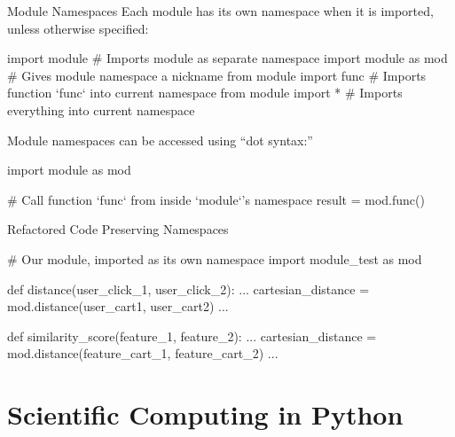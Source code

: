 \documentclass[11pt,table]{beamer}
\begin{document}
\begin{frame}[fragile]{}

\begin{block}{Module Namespaces}
Each module has its own namespace when it is imported, unless otherwise specified:
\begin{mintypython}
import module            # Imports module as separate namespace
import module as mod     # Gives module namespace a nickname 
from module import func  # Imports function `func` into current namespace
from module import *     # Imports everything into current namespace
\end{mintypython}

Module namespaces can be accessed using ``dot syntax:''
\begin{mintypython}
import module as mod

# Call function `func` from inside `module`'s namespace
result = mod.func()
\end{mintypython}
\end{block}

\end{frame}

\begin{frame}[fragile]{Refactored Code Preserving Namespaces}

\begin{mintypython}
# Our module, imported as its own namespace
import module_test as mod

def distance(user_click_1, user_click_2):
    ...
    cartesian_distance = mod.distance(user_cart1, user_cart2)
    ...

def similarity_score(feature_1, feature_2):
    ...
    cartesian_distance = mod.distance(feature_cart_1, feature_cart_2)
    ...
\end{mintypython}

\end{frame}


\section{Scientific Computing in Python}
\end{document}
